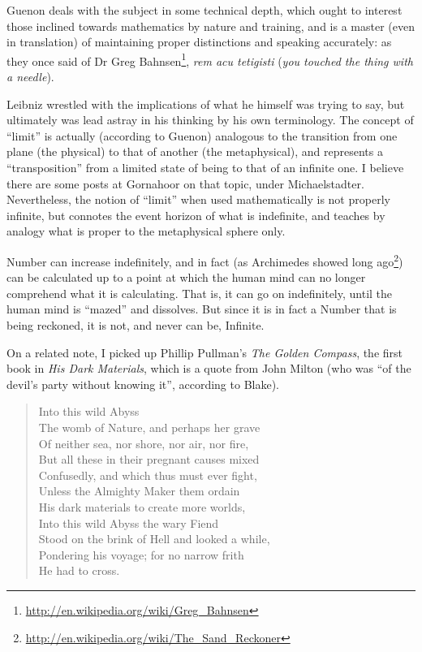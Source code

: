 Guenon deals with the subject in some technical depth, which ought to interest those inclined towards mathematics by nature and training, and is a master (even in translation) of maintaining proper distinctions and speaking accurately: as they once said of Dr Greg Bahnsen\footnote{\url{http://en.wikipedia.org/wiki/Greg_Bahnsen}}, \emph{rem acu tetigisti} (\emph{you touched the thing with a needle}).


Leibniz wrestled with the implications of what he himself was trying to say, but ultimately was lead astray in his thinking by his own terminology. The concept of ``limit'' is actually (according to Guenon) analogous to the transition from one plane (the physical) to that of another (the metaphysical), and represents a ``transposition'' from a limited state of being to that of an infinite one. I believe there are some posts at Gornahoor on that topic, under Michaelstadter. Nevertheless, the notion of ``limit'' when used mathematically is not properly infinite, but connotes the event horizon of what is indefinite, and teaches by analogy what is proper to the metaphysical sphere only.

Number can increase indefinitely, and in fact (as Archimedes showed long ago\footnote{\url{http://en.wikipedia.org/wiki/The\_Sand\_Reckoner}}) can be calculated up to a point at which the human mind can no longer comprehend what it is calculating. That is, it can go on indefinitely, until the human mind is ``mazed'' and dissolves. But since it is in fact a Number that is being reckoned, it is not, and never can be, Infinite.

On a related note, I picked up Phillip Pullman's \emph{The Golden Compass}, the first book in \emph{His Dark Materials}, which is a quote from John Milton (who was ``of the devil's party without knowing it'', according to Blake).

\begin{quotex}
\begin{verse}
Into this wild Abyss\\
The womb of Nature, and perhaps her grave\\
Of neither sea, nor shore, nor air, nor fire,\\
But all these in their pregnant causes mixed\\
Confusedly, and which thus must ever fight,\\
Unless the Almighty Maker them ordain\\
His dark materials to create more worlds,\\
Into this wild Abyss the wary Fiend\\
Stood on the brink of Hell and looked a while,\\
Pondering his voyage; for no narrow frith\\
He had to cross.
\end{verse}
\end{quotex}


